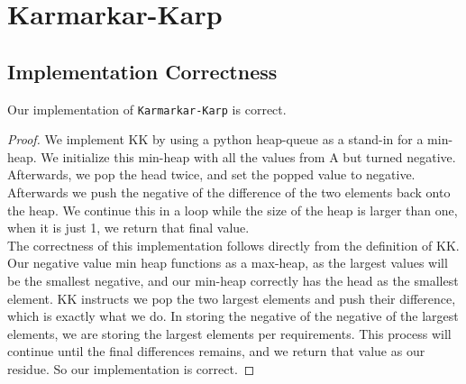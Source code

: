 \documentclass[11pt]{scrartcl}
\theoremstyle{dotlessP}
\theoremstyle{dotlessN}
\theoremstyle{dotN}
\begin{document}
\section{Karmarkar-Karp}
\subsection{Implementation Correctness}
\begin{claim}
Our implementation of \texttt{Karmarkar-Karp} is correct.
\end{claim}
\begin{proof}
     We implement KK by using a python heap-queue as a stand-in for a min-heap. We initialize this min-heap with all the values from A but turned negative. Afterwards, we pop the head twice, and set the popped value to negative. Afterwards we push the negative of the difference of the two elements back onto the heap. We continue this in a loop while the size of the heap is larger than one, when it is just 1, we return that final value.\\

    The correctness of this implementation follows directly from the definition of KK. Our negative value min heap functions as a max-heap, as the largest values will be the smallest negative, and our min-heap correctly has the head as the smallest element. KK instructs we pop the two largest elements and push their difference, which is exactly what we do. In storing the negative of the negative of the largest elements, we are storing the largest elements per requirements. This process will continue until the final differences remains, and we return that value as our residue. So our implementation is correct.    
\end{proof}
\end{document}
